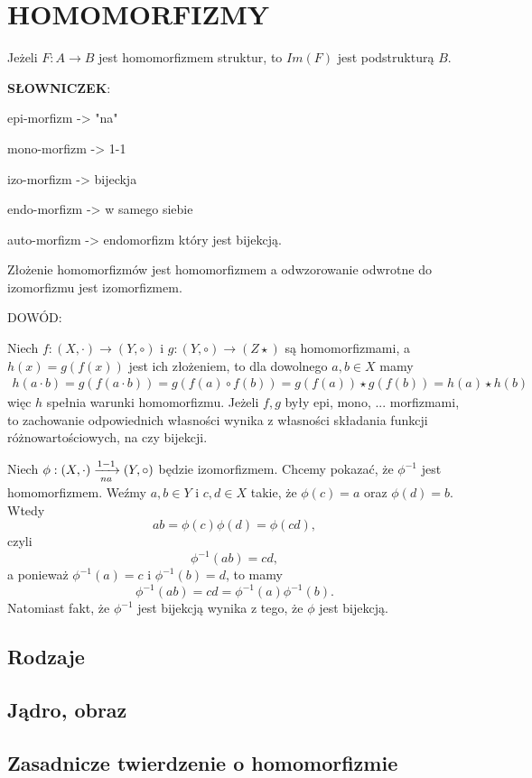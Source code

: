 \section{HOMOMORFIZMY}

Jeżeli $F:A\to B$ jest homomorfizmem struktur, to $Im(F)$ jest podstrukturą $B$.
\bigskip

\pdef
\textbf{\color{def}SŁOWNICZEK}:
\smallskip

    \point epi-morfizm -> "na"

    \point mono-morfizm -> 1-1

    \point izo-morfizm -> bijeckja

    \point endo-morfizm -> w samego siebie

    \point auto-morfizm -> endomorfizm który jest bijekcją.
\smallskip

\kdef
\medskip

{\color{acc}Złożenie homomorfizmów jest homomorfizmem} a odwzorowanie odwrotne do izomorfizmu jest izomorfizmem.
\medskip

{\color{def}DOWÓD:}
\smallskip

Niech $f:(X, \cdot)\to(Y, \circ)$ i $g:(Y, \circ)\to(Z\star)$ są homomorfizmami, a $h(x)=g(f(x))$ jest ich złożeniem, to dla dowolnego $a,b\in X$ mamy
\begin{align*}
    h(a\cdot b)=g(f(a\cdot b))=g(f(a)\circ f(b))=g(f(a))\star g(f(b))=h(a)\star h(b)
\end{align*}
więc $h$ spełnia warunki homomorfizmu. Jeżeli $f, g$ były epi, mono, ... morfizmami, to zachowanie odpowiednich własności wynika z własności składania funkcji różnowartościowych, na czy bijekcji.
\smallskip

Niech $\phi:(X, \cdot)\xrightarrow[na]{1-1} (Y, \circ)$ będzie izomorfizmem. Chcemy pokazać, że $\phi^{-1}$ jest homomorfizmem. Weźmy $a, b\in Y$ i $c, d\in X$ takie, że $\phi(c)=a$ oraz $\phi(d)=b$. Wtedy
$$ab=\phi(c)\phi(d)=\phi(cd),$$
czyli
$$\phi^{-1}(ab)=cd,$$
a ponieważ $\phi^{-1}(a)=c$ i $\phi^{-1}(b)=d$, to mamy
$$\phi^{-1}(ab)=cd=\phi^{-1}(a)\phi^{-1}(b).$$
Natomiast fakt, że $\phi^{-1}$ jest bijekcją wynika z tego, że $\phi$ jest bijekcją.

\subsection{Rodzaje}

\subsection{Jądro, obraz}

\subsection{Zasadnicze twierdzenie o homomorfizmie}